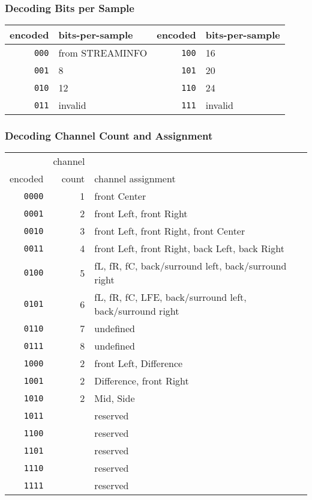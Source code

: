 \subsubsection{Decoding Bits per Sample}
{
\begin{tabular}{rl||rl}
encoded & bits-per-sample &
encoded & bits-per-sample \\
\hline
\texttt{000} & from STREAMINFO &
\texttt{100} & 16 \\
\texttt{001} & 8 &
\texttt{101} & 20 \\
\texttt{010} & 12 &
\texttt{110} & 24 \\
\texttt{011} & invalid &
\texttt{111} & invalid \\
\end{tabular}
}

\subsubsection{Decoding Channel Count and Assignment}
{
\begin{tabular}{rrl}
& channel & \\
encoded & count & channel assignment \\
\hline
\texttt{0000} & 1 & front Center \\
\texttt{0001} & 2 & front Left, front Right \\
\texttt{0010} & 3 & front Left, front Right, front Center \\
\texttt{0011} & 4 & front Left, front Right, back Left, back Right \\
\texttt{0100} & 5 & fL, fR, fC, back/surround left, back/surround right \\
\texttt{0101} & 6 & fL, fR, fC, LFE, back/surround left, back/surround right \\
\texttt{0110} & 7 & undefined \\
\texttt{0111} & 8 & undefined \\
\texttt{1000} & 2 & front Left, Difference \\
\texttt{1001} & 2 & Difference, front Right \\
\texttt{1010} & 2 & Mid, Side \\
\texttt{1011} & & reserved \\
\texttt{1100} & & reserved \\
\texttt{1101} & & reserved \\
\texttt{1110} & & reserved \\
\texttt{1111} & & reserved \\
\end{tabular}
}

